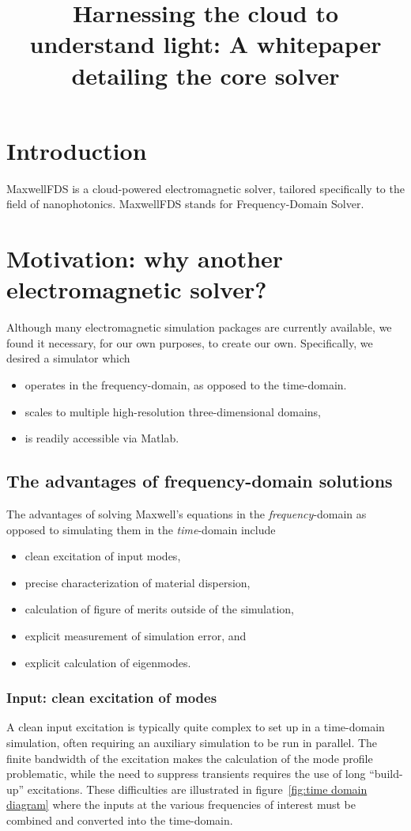 \documentclass{article}
\title{Harnessing the cloud to understand light: 
        A whitepaper detailing the \MaxwellFDS core solver}
\newcommand{\fig}[1]{figure~\ref{fig:#1}}
\newcommand{\MaxwellFDS}{MaxwellFDS }
\newcommand{\BI}{\begin{itemize}\item}
\newcommand{\EI}{\end{itemize}}
\newcommand{\I}{\item}
\begin{document}
\maketitle
\tableofcontents

\section*{Introduction}
\MaxwellFDS is a cloud-powered electromagnetic solver,
    tailored specifically to the field of nanophotonics.
\MaxwellFDS stands for Frequency-Domain Solver.

\section{Motivation: why another electromagnetic solver?}
Although many electromagnetic simulation packages are currently available,
    we found it necessary, for our own purposes, to create our own.
Specifically, we desired a simulator which 
    \BI operates in the frequency-domain, as opposed to the time-domain.
    \I  scales to multiple high-resolution three-dimensional domains,
    \I  is readily accessible via Matlab. \EI

\subsection{The advantages of frequency-domain solutions}
The advantages of solving Maxwell's equations in the  \emph{frequency}-domain 
    as opposed to simulating them in the \emph{time}-domain include
    \BI clean excitation of input modes,
    \I  precise characterization of material dispersion,
    \I  calculation of figure of merits outside of the simulation,
    \I  explicit measurement of simulation error, and
    \I  explicit calculation of eigenmodes. \EI

\subsubsection{Input: clean excitation of modes}
A clean input excitation is typically quite complex to set up
    in a time-domain simulation,
    often requiring an auxiliary simulation to be run in parallel.
The finite bandwidth of the excitation makes the calculation
    of the mode profile problematic, while
    the need to suppress transients requires the use of 
    long ``build-up'' excitations.
These difficulties are illustrated in \fig{time domain diagram}
    where the inputs at the various frequencies of interest
    must be combined and converted into the time-domain.
\end{document}
